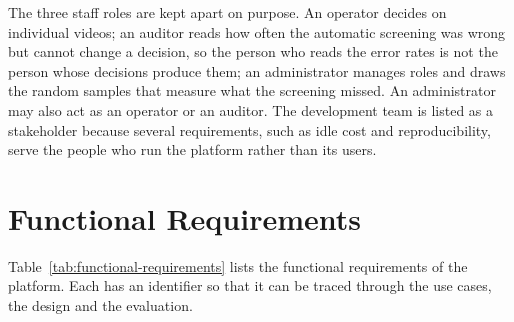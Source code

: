 The three staff roles are kept apart on purpose. An operator decides on individual videos; an
auditor reads how often the automatic screening was wrong but cannot change a decision, so the
person who reads the error rates is not the person whose decisions produce them; an administrator
manages roles and draws the random samples that measure what the screening missed. An administrator
may also act as an operator or an auditor. The development team is listed as a stakeholder because
several requirements, such as idle cost and reproducibility, serve the people who run the platform
rather than its users.

\section{Functional Requirements}
\label{sec:functional-requirements}

Table~\ref{tab:functional-requirements} lists the functional requirements of the platform. Each has
an identifier so that it can be traced through the use cases, the design and the evaluation.

